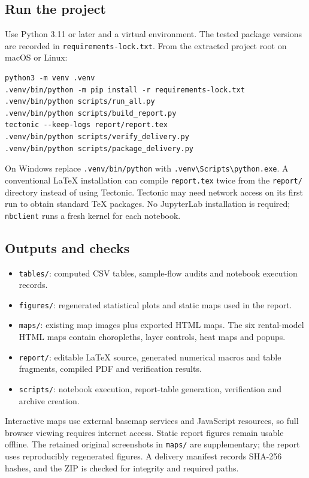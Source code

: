 \documentclass[11pt,a4paper]{article}
\begin{document}
\subsection{Run the project}
Use Python 3.11 or later and a virtual environment. The tested package versions are recorded in \texttt{requirements-lock.txt}. From the extracted project root on macOS or Linux:
\begin{verbatim}
python3 -m venv .venv
.venv/bin/python -m pip install -r requirements-lock.txt
.venv/bin/python scripts/run_all.py
.venv/bin/python scripts/build_report.py
tectonic --keep-logs report/report.tex
.venv/bin/python scripts/verify_delivery.py
.venv/bin/python scripts/package_delivery.py
\end{verbatim}
On Windows replace \texttt{.venv/bin/python} with \texttt{.venv\textbackslash Scripts\textbackslash python.exe}. A conventional LaTeX installation can compile \texttt{report.tex} twice from the \texttt{report/} directory instead of using Tectonic. Tectonic may need network access on its first run to obtain standard TeX packages. No JupyterLab installation is required; \texttt{nbclient} runs a fresh kernel for each notebook.

\subsection{Outputs and checks}
\begin{itemize}
\item \texttt{tables/}: computed CSV tables, sample-flow audits and notebook execution records.
\item \texttt{figures/}: regenerated statistical plots and static maps used in the report.
\item \texttt{maps/}: existing map images plus exported HTML maps. The six rental-model HTML maps contain choropleths, layer controls, heat maps and popups.
\item \texttt{report/}: editable LaTeX source, generated numerical macros and table fragments, compiled PDF and verification results.
\item \texttt{scripts/}: notebook execution, report-table generation, verification and archive creation.
\end{itemize}
Interactive maps use external basemap services and JavaScript resources, so full browser viewing requires internet access. Static report figures remain usable offline. The retained original screenshots in \texttt{maps/} are supplementary; the report uses reproducibly regenerated figures. A delivery manifest records SHA-256 hashes, and the ZIP is checked for integrity and required paths.
\end{document}
